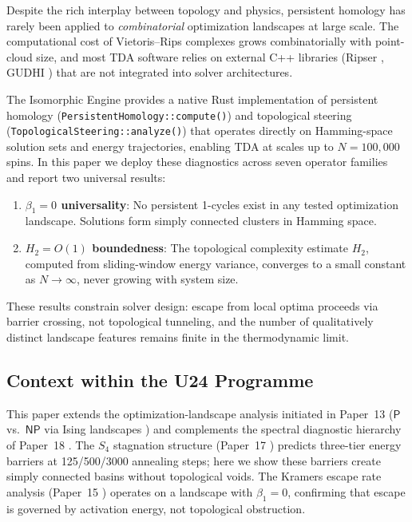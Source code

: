 \documentclass[12pt,a4paper]{article}
\theoremstyle{definition}\newtheorem{definition}[theorem]{Definition}
\theoremstyle{remark}\newtheorem{remark}[theorem]{Remark}
\newcommand{\Htwo}{H_2}
\newcommand{\betaone}{\beta_1}
\begin{document}
Despite the rich interplay between topology and physics, persistent homology
has rarely been applied to \emph{combinatorial} optimization landscapes at
large scale. The computational cost of Vietoris--Rips complexes grows
combinatorially with point-cloud size, and most TDA software relies on
external C++ libraries (Ripser \cite{bauer2021ripser}, GUDHI
\cite{maria2014gudhi}) that are not integrated into solver architectures.

The Isomorphic Engine \cite{dwr2026} provides a native Rust implementation
of persistent homology (\texttt{PersistentHomology::compute()}) and
topological steering (\texttt{TopologicalSteering::analyze()}) that operates
directly on Hamming-space solution sets and energy trajectories, enabling
TDA at scales up to $N = 100{,}000$ spins. In this paper we deploy these
diagnostics across seven operator families and report two universal results:

\begin{enumerate}[label=(\roman*)]
  \item \textbf{$\betaone = 0$ universality}: No persistent 1-cycles exist
    in any tested optimization landscape. Solutions form simply connected
    clusters in Hamming space.
  \item \textbf{$\Htwo = O(1)$ boundedness}: The topological complexity
    estimate $\Htwo$, computed from sliding-window energy variance, converges
    to a small constant as $N \to \infty$, never growing with system size.
\end{enumerate}

These results constrain solver design: escape from local optima proceeds
via barrier crossing, not topological tunneling, and the number of
qualitatively distinct landscape features remains finite in the
thermodynamic limit.

\subsection{Context within the U24 Programme}

This paper extends the optimization-landscape analysis initiated in
Paper~13 ($\mathsf{P}$ vs.~$\mathsf{NP}$ via Ising landscapes \cite{paper13})
and complements the spectral diagnostic hierarchy of Paper~18
\cite{paper18}. The $S_4$ stagnation structure (Paper~17 \cite{paper17})
predicts three-tier energy barriers at 125/500/3000 annealing steps; here
we show these barriers create simply connected basins without topological
voids. The Kramers escape rate analysis (Paper~15 \cite{paper15}) operates
on a landscape with $\betaone = 0$, confirming that escape is governed
by activation energy, not topological obstruction.
\end{document}
